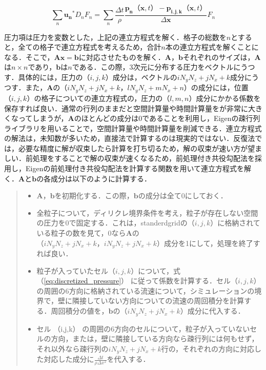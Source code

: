 \documentclass[a4j,12pt]{jreport}
\begin{document}
\begin{equation}
\sum_{n}\bm{u_n}^*D_nF_n= \sum_{n}\frac{\varDelta t}{\rho}\frac{\bm{p_n} （\bm{x},t）  - \bm{p_{i,j,k}} （\bm{x},t） }{\varDelta \bm{x}}F_n
\end{equation}

圧力項は圧力を変数とした，上記の連立方程式を解く．格子の総数を$n$とすると，全ての格子で連立方程式を考えるため，合計$n$本の連立方程式を解くことになる．そこで，$\bm{Ax=b}$に対応させたものを解く．$\bm{A}$，$\bm{b}$それぞれのサイズは，$\bm{A}$は$n \times n$であり，$\bm{b}$は$n$である．この際，3次元に分布する圧力をベクトルにうつす．具体的には，圧力の$ （i,j,k） $成分は，ベクトルの$iN_yN_z+jN_x+k$成分にうつす．また，$\bm{A}$の$ （iN_yN_z+jN_x+k，lN_yN_z+mN_x+n） $の成分には，位置$ （i,j,k） $の格子についての連立方程式の，圧力の$ （l,m,n） $成分にかかる係数を保存すれば良い．通常の行列のままだと空間計算量や時間計算量をが非常に大きくなってしまうが，$\bm{A}$のほとんどの成分は$0$であることを利用し，Eigenの疎行列ライブラリを用いることで，空間計算量や時間計算量を削減できる．連立方程式の解法は，未知数が多いため，直接法で計算するのは現実的ではない．反復法では，必要な精度に解が収束したら計算を打ち切るため，解の収束が速い方が望ましい．前処理をすることで解の収束が速くなるため，前処理付き共役勾配法を採用し，Eigenの前処理付き共役勾配法を計算する関数を用いて連立方程式を解く．$\bm{A}$と$\bm{b}$の各成分は以下のように計算する．
\begin{quote}
	\begin{itemize}
		\item $\bm{A}$，$\bm{b}$を初期化する．この際，$\bm{b}$の成分は全て0にしておく．
		\item 全粒子について，ディリクレ境界条件を考え，粒子が存在しない空間の圧力を$0$で固定する．これは，standerdgridの$ （i,j,k） $に格納されている粒子の数を見て，0なら$\bm{A}$の$ （iN_yN_z+jN_x+k，iN_yN_z+jN_x+k） $成分を1にして，処理を終了すれば良い．
		\item 粒子が入っていたセル$ （i,j,k） $について，式 （\ref{eq:discretized_pressure}） に従って係数を計算する．セル$ （i,j,k） $の周囲の6方向に格納されている流速について，シミュレーションの境界で，壁に隣接していない方向についての流速の周回積分を計算する．周回積分の値を，$\bm{b}$の$ （iN_yN_z+jN_x+k） $成分に代入する．
		\item セル （i,j,k） の周囲の6方向のセルについて，粒子が入っていないセルの方向，または，壁に隣接している方向なら疎行列には何もせず，それ以外なら疎行列の$iN_yN_z+jN_x+k$行の，それぞれの方向に対応した対応した成分に$\frac{\varDelta t}{\rho\varDelta x^2}$を代入する．
	\end{itemize}
\end{quote}
\end{document}

